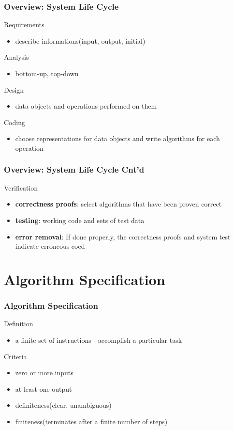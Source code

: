 \documentclass[newPxFont,sthlmFooter,nooffset]{beamer}
\begin{document}
\begin{frame}[t]
  \frametitle{Overview: System Life Cycle}
  
Requirements
\begin{itemize}
\item describe informations(input, output, initial)
\end{itemize}

Analysis
\begin{itemize}
\item bottom-up, top-down
\end{itemize}

Design
\begin{itemize}
\item data objects and operations performed on them
\end{itemize}

Coding
\begin{itemize}
\item choose representations for data objects and write algorithms for
  each operation
\end{itemize}

\end{frame}


\begin{frame}[t]
  \frametitle{Overview: System Life Cycle Cnt'd}
Verification
\begin{itemize}
\item \textbf{correctness proofs}: select algorithms that have been proven correct
\item \textbf{testing}: working code and sets of test data
\item \textbf{error removal}: If done properly, the correctness proofs
  and system test indicate erroneous coed
\end{itemize}
\end{frame}


\section{Algorithm Specification}
\begin{frame}[t]
  \frametitle{Algorithm Specification}
Definition
\begin{itemize}
\item a finite set of instructions - accomplish a particular task
\end{itemize}

Criteria
\begin{itemize}
\item zero or more inputs 
\item at least one output
\item definiteness(clear, unambiguous) 
\item finiteness(terminates after a finite number of steps)
\end{itemize}

\end{frame}
\end{document}
